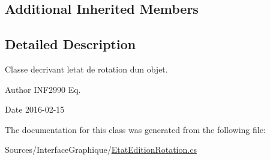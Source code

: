 \subsection*{Additional Inherited Members}


\subsection{Detailed Description}
Classe decrivant l\textquotesingle{}etat de rotation d\textquotesingle{}un objet. 

\begin{DoxyAuthor}{Author}
I\+N\+F2990 Eq. 
\end{DoxyAuthor}
\begin{DoxyDate}{Date}
2016-\/02-\/15 
\end{DoxyDate}


The documentation for this class was generated from the following file\+:\begin{DoxyCompactItemize}
\item 
Sources/\+Interface\+Graphique/\hyperlink{_etat_edition_rotation_8cs}{Etat\+Edition\+Rotation.\+cs}\end{DoxyCompactItemize}
